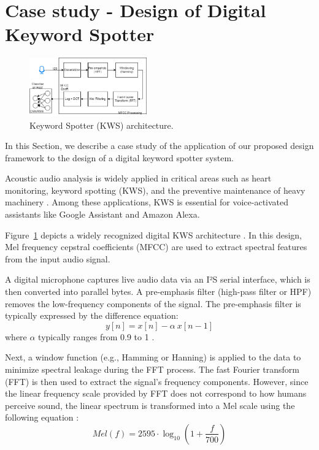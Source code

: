 \section{Case study - Design of Digital Keyword Spotter}
\label{sec:system_design}


\begin{figure}[htbp]	
    \includegraphics[width=0.45\textwidth]{figs/KWS-architecture.png}
    \caption{Keyword Spotter (KWS) architecture.}
    \label{fig:KWS_Arch}
\end{figure}

In this Section, we describe a case study of the application of our proposed design framework to the design of a digital keyword spotter system. 

Acoustic audio analysis is widely applied in critical areas such as heart monitoring, keyword spotting (KWS), and the preventive maintenance of heavy machinery \cite{chong20220}. Among these applications, KWS is essential for voice-activated assistants like Google Assistant and Amazon Alexa.

Figure~\ref{fig:KWS_Arch} depicts a widely recognized digital KWS architecture \cite{chong20220}. In this design, Mel frequency cepstral coefficients (MFCC) are used to extract spectral features from the input audio signal. 

A digital microphone captures live audio data via an I²S serial interface, which is then converted into parallel bytes. A pre-emphasis filter (high-pass filter or HPF) removes the low-frequency components of the signal. The pre-emphasis filter is typically expressed by the difference equation:
\begin{equation}
    y[n] = x[n] - \alpha~x[n-1] \label{eq:hpf}
\end{equation}
where $\alpha$ typically ranges from 0.9 to 1 \cite{han2006efficient}.

Next, a window function (e.g., Hamming or Hanning) is applied to the data to minimize spectral leakage during the FFT process. The fast Fourier transform (FFT) is then used to extract the signal’s frequency components. However, since the linear frequency scale provided by FFT does not correspond to how humans perceive sound, the linear spectrum is transformed into a Mel scale using the following equation \cite{han2006efficient}:
\begin{equation}
    Mel(f) = 2595\cdot \log_{10}\left({1 + \frac{f}{700}}\right) \label{eq:mel-log}
\end{equation}

